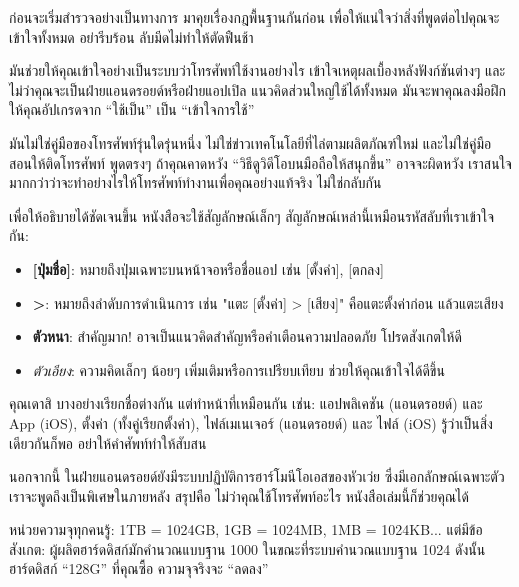 
ก่อนจะเริ่มสำรวจอย่างเป็นทางการ มาคุยเรื่องกฎพื้นฐานกันก่อน เพื่อให้แน่ใจว่าสิ่งที่พูดต่อไปคุณจะเข้าใจทั้งหมด อย่ารีบร้อน ลับมีดไม่ทำให้ตัดฟืนช้า


มันช่วยให้คุณเข้าใจอย่างเป็นระบบว่าโทรศัพท์ใช้งานอย่างไร เข้าใจเหตุผลเบื้องหลังฟังก์ชันต่างๆ และไม่ว่าคุณจะเป็นฝ่ายแอนดรอยด์หรือฝ่ายแอปเปิล แนวคิดส่วนใหญ่ใช้ได้ทั้งหมด มันจะพาคุณลงมือฝึก ให้คุณอัปเกรดจาก “ใช้เป็น” เป็น “เข้าใจการใช้”

มันไม่ใช่คู่มือของโทรศัพท์รุ่นใดรุ่นหนึ่ง ไม่ใช่ข่าวเทคโนโลยีที่ไล่ตามผลิตภัณฑ์ใหม่ และไม่ใช่คู่มือสอนให้ติดโทรศัพท์ พูดตรงๆ ถ้าคุณคาดหวัง “วิธีดูวิดีโอบนมือถือให้สนุกขึ้น” อาจจะผิดหวัง เราสนใจมากกว่าว่าจะทำอย่างไรให้โทรศัพท์ทำงานเพื่อคุณอย่างแท้จริง ไม่ใช่กลับกัน


เพื่อให้อธิบายได้ชัดเจนขึ้น หนังสือจะใช้สัญลักษณ์เล็กๆ สัญลักษณ์เหล่านี้เหมือนรหัสลับที่เราเข้าใจกัน:

\begin{itemize}
  \item \textbf{[ปุ่มชื่อ]}: หมายถึงปุ่มเฉพาะบนหน้าจอหรือชื่อแอป เช่น [ตั้งค่า], [ตกลง]
  \item \textbf{>}: หมายถึงลำดับการดำเนินการ เช่น "แตะ [ตั้งค่า] > [เสียง]" คือแตะตั้งค่าก่อน แล้วแตะเสียง
  \item \textbf{ตัวหนา}: สำคัญมาก! อาจเป็นแนวคิดสำคัญหรือคำเตือนความปลอดภัย โปรดสังเกตให้ดี
  \item \emph{ตัวเอียง}: ความคิดเล็กๆ น้อยๆ เพิ่มเติมหรือการเปรียบเทียบ ช่วยให้คุณเข้าใจได้ดีขึ้น
\end{itemize}


คุณเดาสิ บางอย่างเรียกชื่อต่างกัน แต่ทำหน้าที่เหมือนกัน เช่น: แอปพลิเคชัน (แอนดรอยด์) และ App (iOS), ตั้งค่า (ทั้งคู่เรียกตั้งค่า), ไฟล์เมเนเจอร์ (แอนดรอยด์) และ ไฟล์ (iOS) รู้ว่าเป็นสิ่งเดียวกันก็พอ อย่าให้คำศัพท์ทำให้สับสน

นอกจากนี้ ในฝ่ายแอนดรอยด์ยังมีระบบปฏิบัติการฮาร์โมนีโอเอสของหัวเว่ย ซึ่งมีเอกลักษณ์เฉพาะตัว เราจะพูดถึงเป็นพิเศษในภายหลัง สรุปคือ ไม่ว่าคุณใช้โทรศัพท์อะไร หนังสือเล่มนี้ก็ช่วยคุณได้


หน่วยความจุทุกคนรู้: 1TB = 1024GB, 1GB = 1024MB, 1MB = 1024KB... แต่มีข้อสังเกต: ผู้ผลิตฮาร์ดดิสก์มักคำนวณแบบฐาน 1000 ในขณะที่ระบบคำนวณแบบฐาน 1024 ดังนั้นฮาร์ดดิสก์ “128G” ที่คุณซื้อ ความจุจริงจะ “ลดลง”


